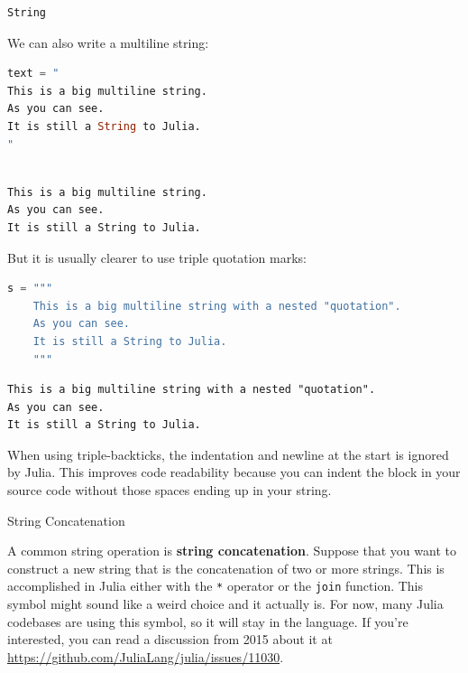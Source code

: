 \documentclass[
  notoc %
]{tufte-book}
\makeatletter
\newcommand{\passthrough}[1]{#1}
\renewcommand\subsubsection{%
\@startsection{subsubsection}{3}{\z@ }{-3.25ex\@plus -1ex \@minus -.2ex}{1.5ex \@plus .2ex}{\normalfont \normalsize \bfseries }
}
\makeatother
\begin{document}
\begin{lstlisting}[language=Output]
String
\end{lstlisting}

We can also write a multiline string:

\begin{lstlisting}[language=Julia]
text = "
This is a big multiline string.
As you can see.
It is still a String to Julia.
"
\end{lstlisting}

\begin{lstlisting}[language=Output]

This is a big multiline string.
As you can see.
It is still a String to Julia.

\end{lstlisting}

But it is usually clearer to use triple quotation marks:

\begin{lstlisting}[language=Julia]
s = """
    This is a big multiline string with a nested "quotation".
    As you can see.
    It is still a String to Julia.
    """
\end{lstlisting}

\begin{lstlisting}[language=Output]
This is a big multiline string with a nested "quotation".
As you can see.
It is still a String to Julia.

\end{lstlisting}

When using triple-backticks, the indentation and newline at the start is
ignored by Julia. This improves code readability because you can indent
the block in your source code without those spaces ending up in your
string.

\hypertarget{sec:string_concatenation}{%
\subsubsection{String Concatenation}\label{sec:string_concatenation}}

A common string operation is \textbf{string concatenation}. Suppose that
you want to construct a new string that is the concatenation of two or
more strings. This is accomplished in Julia either with the
\passthrough{\lstinline!*!} operator or the
\passthrough{\lstinline!join!} function. This symbol might sound like a
weird choice and it actually is. For now, many Julia codebases are using
this symbol, so it will stay in the language. If you're interested, you
can read a discussion from 2015 about it at
\url{https://github.com/JuliaLang/julia/issues/11030}.
\end{document}
